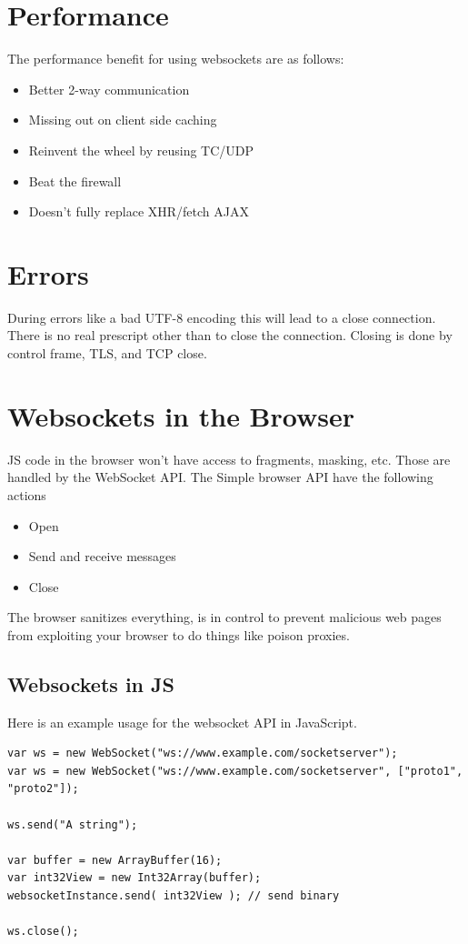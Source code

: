 \documentclass[../CMPUT-404-Notes.tex]{subfiles}
\begin{document}
\section{Performance}
The performance benefit for using websockets are as follows:
\begin{itemize}
    \item Better 2-way communication
    \item Missing out on client side caching 
    \item Reinvent the wheel by reusing TC/UDP
    \item Beat the firewall 
    \item Doesn't fully replace XHR/fetch AJAX  
\end{itemize}

\section{Errors}
During errors like a bad UTF-8 encoding this will lead to a close connection. 
There is no real prescript other than to close the connection.
Closing is done by control frame, TLS, and TCP close.

\section{Websockets in the Browser}
JS code in the browser won't have access to fragments, masking, etc.
Those are handled by the WebSocket API.
The Simple browser API have the following actions
\begin{itemize}
    \item Open 
    \item Send and receive messages 
    \item Close
\end{itemize}
The browser sanitizes everything, is in control to prevent malicious web pages from exploiting your browser to do things like poison proxies.

\subsection{Websockets in JS}
Here is an example usage for the websocket API in JavaScript.

\begin{verbatim}
var ws = new WebSocket("ws://www.example.com/socketserver");
var ws = new WebSocket("ws://www.example.com/socketserver", ["proto1", "proto2"]);

ws.send("A string");

var buffer = new ArrayBuffer(16);
var int32View = new Int32Array(buffer);
websocketInstance.send( int32View ); // send binary

ws.close(); 
\end{verbatim}
\end{document}
